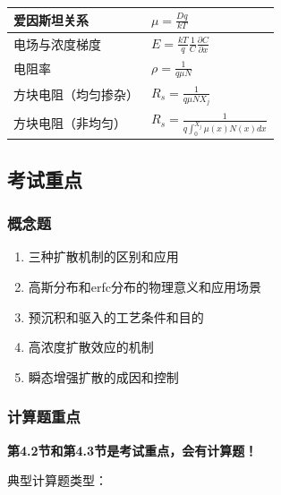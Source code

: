 \documentclass[UTF8,12pt,a4paper]{ctexart}
\begin{document}
\begin{longtable}{|L{6cm}|L{9cm}|}
爱因斯坦关系 & $\mu = \frac{Dq}{kT}$ \\
\hline

电场与浓度梯度 & $E = \frac{kT}{q}\frac{1}{C}\frac{\partial C}{\partial x}$ \\
\hline

电阻率 & $\rho = \frac{1}{q\mu N}$ \\
\hline

方块电阻（均匀掺杂） & $R_s = \frac{1}{q\mu N X_j}$ \\
\hline

方块电阻（非均匀） & $R_s = \frac{1}{q\int_0^{X_j}\mu(x)N(x)dx}$ \\
\hline

\end{longtable}

\subsection{考试重点}

\subsubsection{概念题}

\begin{enumerate}
    \item 三种扩散机制的区别和应用
    \item 高斯分布和erfc分布的物理意义和应用场景
    \item 预沉积和驱入的工艺条件和目的
    \item 高浓度扩散效应的机制
    \item 瞬态增强扩散的成因和控制
\end{enumerate}

\subsubsection{计算题重点}

\textbf{第4.2节和第4.3节是考试重点，会有计算题！}

典型计算题类型：
\end{document}

